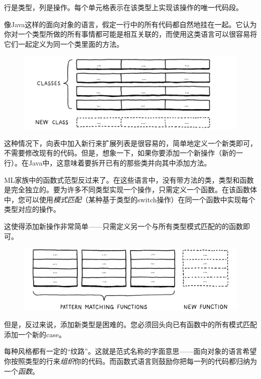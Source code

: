 \documentclass[cn,11pt,chinese]{elegantbook}
\begin{document}
行是类型，列是操作。每个单元格表示在该类型上实现该操作的唯一代码段。

像Java这样的面向对象的语言，假定一行中的所有代码都自然地挂在一起。它认为你对一个类型所做的所有事情都可能是相互关联的，而使用这类语言可以很容易将它们一起定义为同一个类里面的方法。

\begin{figure}[htbp]
  \centering
  \includegraphics[width=\textwidth]{image/representing-code/rows.png}
\end{figure}

这种情况下，向表中加入新行来扩展列表是很容易的，简单地定义一个新类即可，不需要修改现有的代码。但是，想象一下，如果你要添加一个新操作（新的一行）。在Java中，这意味着要拆开已有的那些类并向其中添加方法。

ML家族中的函数式范型反过来了。在这些语言中，没有带方法的类，类型和函数是完全独立的。要为许多不同类型实现一个操作，只需定义一个函数。在该函数体中，您可以使用\textit{模式匹配}（某种基于类型的switch操作）在同一个函数中实现每个类型对应的操作。

这使得添加新操作非常简单——只需定义另一个与所有类型模式匹配的的函数即可。

\begin{figure}[htbp]
  \centering
  \includegraphics[width=\textwidth]{image/representing-code/columns.png}
\end{figure}

但是，反过来说，添加新类型是困难的。您必须回头向已有函数中的所有模式匹配添加一个新的case。

每种风格都有一定的“纹路”。这就是范式名称的字面意思——面向对象的语言希望你按照类型的行来\textit{组织}你的代码。而函数式语言则鼓励你把每一列的代码都归纳为一个\textit{函数}。
\end{document}
